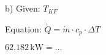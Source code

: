 b) Given: \( T_{KF} \)  

Equation:  
\( \dot{Q} = \dot{m} \cdot c_p \cdot \Delta T \)  

\( 62.182 \, \text{kW} = \dots \)